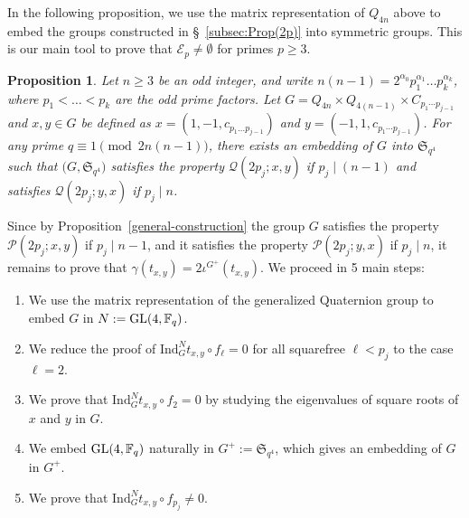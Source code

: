 \documentclass[12pt]{amsart}
\numberwithin{equation}{section}
\newcommand{\GL}{{\rm GL}}
\newcommand{\F}{\mathbb F}
\newtheorem{prop}[X]{Proposition}
\theoremstyle{definition}
\theoremstyle{remark}
\begin{document}
 In the following proposition, we use the matrix representation of $Q_{4n}$ above to embed the groups constructed in \S~\ref{subsec:Prop(2p)} into symmetric groups. This is our main tool to prove that $\mathcal{E}_p\ne \emptyset$ for primes $p\ge3$.
\begin{prop}\label{generalembedding}
    Let $n\ge 3$ be an odd integer, and write $n(n-1)=2^{\alpha_0}p_1^{\alpha_1}\dots p_k^{\alpha_k}$, where $p_1<\dots<p_k$ are the odd prime factors. Let $G=Q_{4n}\times Q_{4(n-1)}\times C_{p_1\cdots p_{j-1}}$ and $x,y\in G$ be defined as $x=(1,-1,c_{p_1\dots p_{j-1}})$ and $y=(-1,1,c_{p_1\cdots p_{j-1}})$. 
    For any prime $q\equiv 1 \pmod{2n(n-1)}$, there exists an embedding of $G$ into $\mathfrak{S}_{q^4}$ such that $\bigl(G,\mathfrak{S}_{q^4}\bigr)$ satisfies the property $\mathcal{Q}(2p_j;x,y)$ if $p_j\mid (n-1)$ and satisfies $\mathcal{Q}(2p_j;y,x)$ if $p_j\mid n$.
\end{prop}
Since by Proposition~\ref{general-construction} the group $G$ satisfies the property $\mathcal{P}(2p_j;x,y)$ if $p_j \mid n-1$, and it satisfies the property $\mathcal{P}(2p_j;y,x)$ if $p_j \mid n$, it remains to prove that $\gamma(t_{x,y})=2\iota^{G^+}(t_{x,y})$. We proceed in 5 main steps: \begin{enumerate}
    \item We use the matrix representation of the generalized Quaternion group to embed $G$ in $N:=\GL(4,\F_q)$. 
    \item We reduce the proof of $\mathrm{Ind}_G^N t_{x,y}\circ f_\ell=0$ for all squarefree $\ell< p_j$ to the case $\ell=2$.
    \item We prove that $\mathrm{Ind}_G^N t_{x,y}\circ f_2=0$ by studying the eigenvalues of square roots of $x$ and $y$ in $G$.
    \item We embed $\GL(4,\F_q)$ naturally in $G^+:=\mathfrak{S}_{q^4}$, which gives an embedding of $G$ in $G^+$.
    \item We prove that $\mathrm{Ind}_G^N t_{x,y}\circ f_{p_j}\ne0$.
\end{enumerate}
\end{document}
